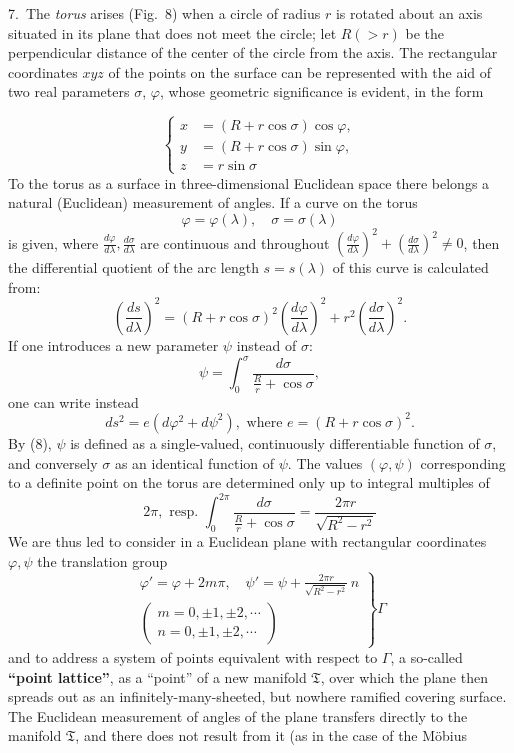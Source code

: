 \documentclass{article}
\begin{document}

7.\ The \emph{torus} arises (Fig.~8) when a circle of radius $r$ is rotated about an axis situated in its plane that does not meet the circle; let $R (> r)$ be the perpendicular distance of the center of the circle from the axis. The rectangular coordinates $xyz$ of the points on the surface can be represented with the aid of two real parameters $\sigma$, $\varphi$, whose geometric significance is evident, in the form

\[
\left\{
\begin{aligned}
x &= (R + r \cos \sigma) \cos \varphi, \\
y &= (R + r \cos \sigma) \sin \varphi, \\
z &= r \sin \sigma
\end{aligned}
\right.
\]
To the torus as a surface in three-dimensional Euclidean space there belongs a natural (Euclidean) measurement of angles. If a curve on the torus
\[
\varphi = \varphi(\lambda), \quad \sigma = \sigma(\lambda)
\]
is given, where $\frac{d\varphi}{d\lambda}, \frac{d\sigma}{d\lambda}$ are continuous and throughout $\left(\frac{d\varphi}{d\lambda}\right)^2 + \left(\frac{d\sigma}{d\lambda}\right)^2 \ne 0$, then the differential quotient of the arc length $s = s(\lambda)$ of this curve is calculated from:
\[
\left(\frac{ds}{d\lambda}\right)^2 = (R + r \cos \sigma)^2 \left(\frac{d\varphi}{d\lambda}\right)^2 + r^2 \left(\frac{d\sigma}{d\lambda}\right)^2.
\]
If one introduces a new parameter $\psi$ instead of $\sigma$:
\[
\psi = \int_0^\sigma \frac{d\sigma}{\frac{R}{r} + \cos \sigma}, \tag{8}
\]
one can write instead
\[
ds^2 = e(d\varphi^2 + d\psi^2), \text{ where } e = (R + r \cos \sigma)^2. \tag{9}
\]
By (8), $\psi$ is defined as a single-valued, continuously differentiable function of $\sigma$, and conversely $\sigma$ as an identical function of $\psi$. The values $(\varphi, \psi)$ corresponding to a definite point on the torus are determined only up to integral multiples of
\[
2\pi, \text{ resp. } \int_0^{2\pi} \frac{d\sigma}{\frac{R}{r} + \cos \sigma} = \frac{2\pi r}{\sqrt{R^2 - r^2}}
\]
We are thus led to consider in a Euclidean plane with rectangular coordinates $\varphi, \psi$ the translation group
\[
\left.
\begin{gathered}
\varphi' = \varphi + 2m\pi, \quad \psi' = \psi + \frac{2\pi r}{\sqrt{R^2 - r^2}}\,n \\
\begin{pmatrix}
m = 0, \pm 1, \pm 2, \cdots \\
n = 0, \pm 1, \pm 2, \cdots
\end{pmatrix}
\end{gathered}
\right\} \varGamma
\]
and to address a system of points equivalent with respect to $\varGamma$, a so-called \textbf{``point lattice''}, as a ``point'' of a new manifold $\mathfrak{T}$, over which the plane then spreads out as an infinitely-many-sheeted, but nowhere ramified covering surface. The Euclidean measurement of angles of the plane transfers directly to the manifold $\mathfrak{T}$, and there does not result from it (as in the case of the Möbius
\end{document}

